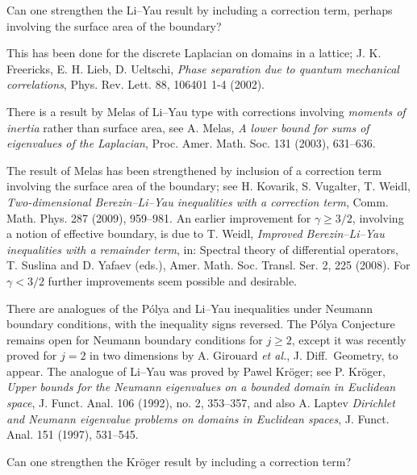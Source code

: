 \documentclass[12pt,letterpaper, reqno]{aimpl}
\begin{document}
\begin{problemblock}


\begin{problem}[1.2]
 Can one strengthen the Li--Yau result by
including a correction term, perhaps involving the surface area of
the boundary?
\end{problem}

This has been done for the discrete
Laplacian on domains in a lattice; J. K. Freericks, E. H. Lieb, D. Ueltschi, \emph{Phase separation due to quantum mechanical correlations}, Phys. Rev. Lett. 88, 106401 1-4 (2002).

\begin{remark}
There is a result by Melas of Li--Yau type with
corrections involving \emph{moments of inertia} rather than surface
area, see A. Melas, \emph{A lower bound for sums of eigenvalues of the Laplacian},
Proc. Amer. Math. Soc. 131 (2003), 631--636.
\end{remark}

\begin{remark}
 The result of Melas has been strengthened by inclusion
of a correction term involving the surface area of the boundary; see
H. Kovarik, S. Vugalter, T. Weidl, \emph{Two-dimensional Berezin--Li--Yau
inequalities with a correction term}, Comm. Math. Phys. 287 (2009),
959--981. An earlier improvement for $\gamma\geq 3/2$, involving
a notion of effective boundary, is due to T. Weidl, \emph{Improved
Berezin--Li--Yau inequalities with a remainder term}, in: Spectral
theory of differential operators, T. Suslina and D. Yafaev (eds.),
Amer. Math. Soc. Transl. Ser. 2, 225 (2008). For $\gamma<3/2$ further
improvements seem possible and desirable.
\end{remark}

\end{problemblock}


\begin{problemblock}


There are analogues of the P\'{o}lya and Li--Yau inequalities under
Neumann boundary conditions, with the inequality signs reversed. The P\'{o}lya Conjecture
remains open for Neumann boundary conditions for $j \geq 2$, except it was recently proved for $j=2$ in two dimensions by A. Girouard \emph{et al.}, J. Diff.\ Geometry, to appear. The analogue
of Li--Yau was proved by Pawel Kr\"{o}ger; see P. Kr\"{o}ger, \emph{Upper bounds for the Neumann eigenvalues on a bounded domain in Euclidean space}, J. Funct. Anal.  106  (1992),  no. 2, 353--357, and also A. Laptev \emph{Dirichlet and Neumann
eigenvalue problems on domains in Euclidean spaces}, J. Funct. Anal.
151 (1997), 531--545. 

\begin{problem}[1.3]
Can one strengthen the Kr\"{o}ger result by including a correction term?

\end{problem}

\end{problemblock}
\end{document}
